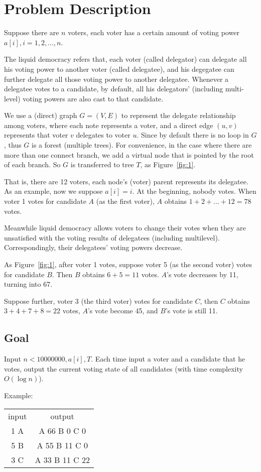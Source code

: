 \section{Problem Description}
Suppose there are $n$ voters, each voter has a certain amount of voting power $a[i],i=1,2,...,n$.

The liquid democracy refers that, each voter (called delegator) can delegate all his voting power to another voter (called delegatee), and his degegatee can further delegate all those voting power to another delegatee. Whenever a delegatee votes to a candidate, by default, all his delegators' (including multi-level) voting powers are also cast to that candidate.

We use a (direct) graph $G=(V,E)$ to represent the delegate relationship among
voters, where each note represents a voter, and a direct edge $(u,v)$
represents that voter $v$ delegates to voter $u$. Since by default there is no
loop in $G$, thus $G$ is a forest (multiple trees). For convenience, in the
case where there are more than one connect branch, we add a virtual node that
is pointed by the root of each branch. So $G$ is transferred to tree $T$, as
Figure~\ref{fig:1}.

That is, there are 12 voters, each node's  (voter) parent represents its
delegatee. As an example, now we  suppose $a[i]=i$. At the beginning, nobody
votes. When voter 1 votes for candidate $A$ (as the first voter), $A$ obtains
$1+2+...+12=78$ votes.

Meanwhile liquid democracy allows voters to change their votes when they are unsatisfied with the voting results of delegatees (including multilevel). Correspondingly, their delegatees' voting powers decrease.

As Figure~\ref{fig:1}, after voter 1 votes, suppose voter 5 (as the second
voter) votes for candidate $B$. Then $B$ obtains $6+5=11$ votes. $A$'s vote
decreases by 11, turning into 67.

Suppose further, voter 3 (the third voter) votes for candidate $C$, then $C$
obtains $3+4+7+8=22$ votes, $A$'s  vote become 45, and $B$'s vote is still 11.

\begin{figure*}
  \centering
	\label{fig:1}
  
	\caption{Tree $T$. We ignore the virtual node with index 0 here.}
\end{figure*}
\subsection{Goal}
Input $n<10000000,a[i],T$. Each time input a voter and a candidate that he votes, output the current voting state of all candidates (with time complexity $O(\log n)$).

Example:

\begin{tabular}{|c|c|}
input & output \\
1 A			&		A 66 B 0 C 0
\\
5 B			&		A 55 B 11 C 0
\\
3 C			&		A 33 B 11 C 22
\end{tabular}


